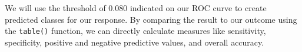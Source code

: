 \documentclass[
  letterpaper,
]{krantz}
\makeatletter
\newenvironment{Shaded}{\begin{snugshade}}{\end{snugshade}}
\newcommand{\AttributeTok}[1]{\textcolor[rgb]{0.40,0.45,0.13}{#1}}
\newcommand{\CommentTok}[1]{\textcolor[rgb]{0.37,0.37,0.37}{#1}}
\newcommand{\DecValTok}[1]{\textcolor[rgb]{0.68,0.00,0.00}{#1}}
\newcommand{\FloatTok}[1]{\textcolor[rgb]{0.68,0.00,0.00}{#1}}
\newcommand{\FunctionTok}[1]{\textcolor[rgb]{0.28,0.35,0.67}{#1}}
\newcommand{\NormalTok}[1]{\textcolor[rgb]{0.00,0.23,0.31}{#1}}
\newcommand{\OtherTok}[1]{\textcolor[rgb]{0.00,0.23,0.31}{#1}}
\newcommand{\SpecialCharTok}[1]{\textcolor[rgb]{0.37,0.37,0.37}{#1}}
\newenvironment{kframe}{%
\medskip{}
\setlength{\fboxsep}{.8em}
 \def\at@end@of@kframe{}%
 \ifinner\ifhmode%
  \def\at@end@of@kframe{\end{minipage}}%
  \begin{minipage}{\columnwidth}%
 \fi\fi%
 \def\FrameCommand##1{\hskip\@totalleftmargin \hskip-\fboxsep
 \colorbox{shadecolor}{##1}\hskip-\fboxsep
     \hskip-\linewidth \hskip-\@totalleftmargin \hskip\columnwidth}%
 \MakeFramed {\advance\hsize-\width
   \@totalleftmargin\z@ \linewidth\hsize
   \@setminipage}}%
 {\par\unskip\endMakeFramed%
 \at@end@of@kframe}
\renewenvironment{Shaded}{\begin{kframe}}{\end{kframe}}
\makeatother
\begin{document}
\begin{Shaded}
\end{Shaded}

We will use the threshold of 0.080 indicated on our ROC curve to create
predicted classes for our response. By comparing the result to our
outcome using the \texttt{table()} function, we can directly calculate
measures like sensitivity, specificity, positive and negative predictive
values, and overall accuracy.

\begin{Shaded}
\end{Shaded}
\end{document}
